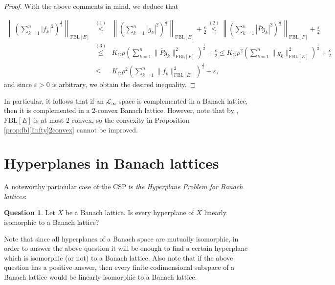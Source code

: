 \documentclass[11pt]{amsart}
\theoremstyle{definition}
\newtheorem{question}{Question}
\numberwithin{equation}{section}
\newcommand{\fbl}{\text{FBL}}
\begin{document}
\begin{proof}
With the above comments in mind, we deduce that

\begin{eqnarray*}
 \left\|\left(\sum_{k=1}^n |f_k|^2 \right)^\frac{1}{2} \right\|_{\fbl[E]} & \overset{(1)}{\leq}&  \left\|\left(\sum_{k=1}^n |g_k|^2 \right)^\frac{1}{2} \right\|_{\fbl[E]}+\frac{\varepsilon}{2}    \overset{(2)}{\leq} \left\|\left(\sum_{k=1}^n |\overline{P}g_k|^2 \right)^\frac{1}{2} \right\|_{\fbl[F]}+\frac{\varepsilon}{2} \\
 &\overset{(3)}{\leq}& K_G\rho\left(\sum_{k=1}^n \|\overline{P}g_k\|_{\fbl[F]}^2\right)^\frac{1}{2}+\frac{\varepsilon}{2}\leq  K_G\rho^2\left(\sum_{k=1}^n \|g_k\|_{\fbl[E]}^2\right)^\frac{1}{2}+\frac{\varepsilon}{2} \\
 &\leq & K_G\rho^2\left(\sum_{k=1}^n \|f_k\|_{\fbl[E]}^2\right)^\frac{1}{2}+\varepsilon,
\end{eqnarray*}
and since $\varepsilon>0$ is arbitrary, we obtain the desired inequality.  
\end{proof}
In particular, it follows that if an $\mathcal{L}_\infty$-space is complemented in a Banach lattice, then it is complemented in a 2-convex Banach lattice. However, note that by \cite[Proposition 9.30]{OTTT24}, $\fbl[E]$ is at most $2$-convex, so the convexity in Proposition \ref{prop:fbl[linfty]2convex} cannot be improved.

\section{Hyperplanes in Banach lattices}\label{sec:hyperplanes}

A noteworthy particular case of the CSP is \textit{the Hyperplane Problem for Banach lattices}:

\begin{question}
Let $X$ be a Banach lattice. Is every hyperplane of $X$ linearly isomorphic to a Banach lattice?    
\end{question}

Note that since all hyperplanes of a Banach space are mutually isomorphic, in order to answer the above question it will be enough to find a certain hyperplane which is isomorphic (or not) to a Banach lattice. Also note that if the above question has a positive answer, then every finite codimensional subspace of a Banach lattice would be linearly isomorphic to a Banach lattice.
\end{document}
